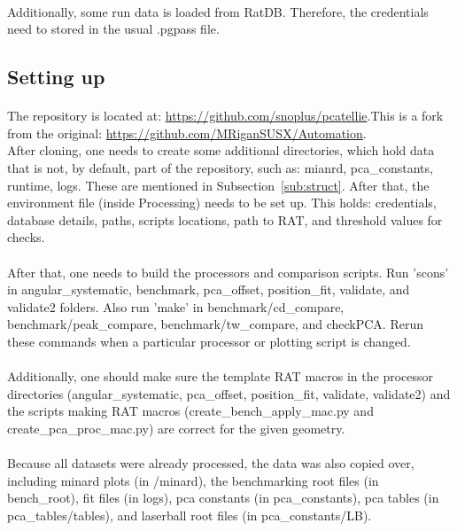 \documentclass[12pt]{article}
\begin{document}
\paragraph{}
Additionally, some run data is loaded from RatDB. Therefore, the credentials need to stored in the usual .pgpass file.

\subsection{Setting up}
\paragraph{}
The repository is located at: \href{https://github.com/snoplus/pcatellie}{https://github.com/snoplus/pcatellie}.This is a fork from the original: \href{https://github.com/MRiganSUSX/Automation}{https://github.com/MRiganSUSX/Automation}.\\
After cloning, one needs to create some additional directories, which hold data that is not, by default, part of the repository, such as: mianrd, pca\_constants, runtime, logs. These are mentioned in Subsection~\ref{sub:struct}. After that, the environment file (inside Processing) needs to be set up. This holds: credentials, database details, paths, scripts locations, path to RAT, and threshold values for checks.

\paragraph{}
After that, one needs to build the processors and comparison scripts. Run 'scons' in angular\_systematic, benchmark, pca\_offset, position\_fit, validate, and validate2 folders. Also run 'make' in benchmark/cd\_compare, benchmark/peak\_compare, benchmark/tw\_compare, and checkPCA. Rerun these commands when a particular processor or plotting script is changed.

\paragraph{}
Additionally, one should make sure the template RAT macros in the processor directories (angular\_systematic, pca\_offset, position\_fit, validate, validate2) and the scripts making RAT macros (create\_bench\_apply\_mac.py and create\_pca\_proc\_mac.py) are correct for the given geometry.

\paragraph{}
Because all datasets were already processed, the data was also copied over, including minard plots (in /minard), the benchmarking root files (in bench\_root), fit files (in logs), pca constants (in pca\_constants), pca tables (in pca\_tables/tables), and laserball root files (in pca\_constants/LB).
\end{document}
